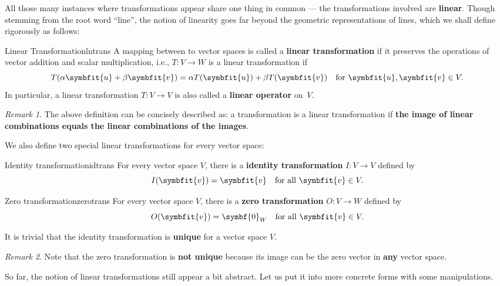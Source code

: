 \documentclass[math]{amznotes}
\theoremstyle{remark}
\newtheorem*{remark}{Remark}
\begin{document}
All those many instances where transformations appear share one thing in common --- the transformations involved are {\color{red} \textbf{linear}}. Though stemming from the root word ``line'', the notion of linearity goes far beyond the geometric representations of lines, which we shall define rigorously as follows:
\begin{dfnbox}{Linear Transformation}{lntrans}
    A mapping between to vector spaces is called a {\color{red} \textbf{linear transformation}} if it preserves the operations of vector addition and scalar multiplication, i.e., $T
    \colon V \rightarrow W$ is a linear transformation if
    \begin{equation*}
        T(\alpha \symbfit{u} + \beta \symbfit{v}) = \alpha T(\symbfit{u}) + \beta T(\symbfit{v}) \quad \textrm{for }\symbfit{u}, \symbfit{v} \in V.
    \end{equation*}
    In particular, a linear transformation $T \colon V  \rightarrow V$ is also called a {\color{red} \textbf{linear operator}} on~$V$.
\end{dfnbox}
\begin{notebox}
    \begin{remark}
        The above definition can be concisely described as: a transformation is a linear transformation if {\color{red} \textbf{the image of linear combinations equals the linear combinations of the images}}.
    \end{remark}
\end{notebox}
We also define two special linear transformations for every vector space:
\begin{dfnbox}{Identity transformation}{idtrans}
    For every vector space $V$, there is a {\color{red} \textbf{identity transformation}} $I \colon V \rightarrow V$ defined by 
    \begin{displaymath}
        I(\symbfit{v}) = \symbfit{v} \quad \textrm{for all } \symbfit{v} \in V.
    \end{displaymath} 
\end{dfnbox}
\begin{dfnbox}{Zero transformation}{zerotrans}
    For every vector space $V$, there is a {\color{red} \textbf{zero transformation}} $O \colon V \rightarrow W$ defined by 
    \begin{displaymath}
        O(\symbfit{v}) = \symbf{0}_W \quad \textrm{for all } \symbfit{v} \in V.
    \end{displaymath} 
\end{dfnbox}
It is trivial that the identity transformation is {\color{red} \textbf{unique}} for a vector space $V$.
\begin{notebox}
    \begin{remark}
        Note that the zero transformation is {\color{red} \textbf{not unique}} because its image can be the zero vector in {\color{red} \textbf{any}} vector space.
    \end{remark}
\end{notebox}
So far, the notion of linear transformations still appear a bit abstract. Let us put it into more concrete forms with some manipulations.
\end{document}
